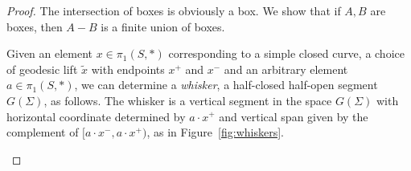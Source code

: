 \begin{proof}
The intersection of boxes is obviously a box. 
We show that if $A,B$ are boxes, then $A - B$ is a finite union of boxes. 

Given an element $x \in \pi_1(S,*)$ corresponding to a simple closed curve, a choice of geodesic lift $\tilde{x}$ with endpoints $x^{+}$ and $x^{-}$ and an arbitrary element $a \in \pi_1(S,*)$, we can determine a \emph{whisker}, a half-closed half-open segment $G(\Sigma)$, as follows. The whisker is a vertical segment in the space $G(\Sigma)$ with horizontal coordinate determined by $a \cdot x^{+}$ and vertical span given by the complement of $[a \cdot x^{-},a \cdot x^{+})$, as in Figure~\ref{fig:whiskers}.

\begin{figure}
\end{figure}

\begin{figure}
\end{figure}



\end{proof}
